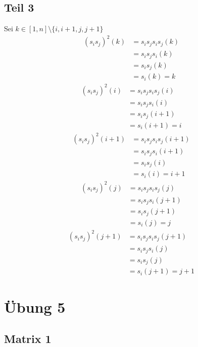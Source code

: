 \documentclass[10pt,a4paper]{article}
\begin{document}
\subsection*{Teil 3}

Sei $k \in [1, n] \setminus \{i, i + 1, j, j + 1\}$
\begin{align*}
(s_{i}s_{j})^{2}(k) & = s_{i}s_{j}s_{i}s_{j}(k)\\
& = s_{i}s_{j}s_{i}(k)\\
& = s_{i}s_{j}(k)\\
& = s_{i}(k) = k
\end{align*}
\begin{align*}
(s_{i}s_{j})^{2}(i) & = s_{i}s_{j}s_{i}s_{j}(i)\\
& = s_{i}s_{j}s_{i}(i)\\
& = s_{i}s_{j}(i + 1)\\
& = s_{i}(i + 1) = i
\end{align*}
\begin{align*}
(s_{i}s_{j})^{2}(i + 1) & = s_{i}s_{j}s_{i}s_{j}(i + 1)\\
& = s_{i}s_{j}s_{i}(i + 1)\\
& = s_{i}s_{j}(i)\\
& = s_{i}(i) = i + 1
\end{align*}
\begin{align*}
(s_{i}s_{j})^{2}(j) & = s_{i}s_{j}s_{i}s_{j}(j)\\
& = s_{i}s_{j}s_{i}(j + 1)\\
& = s_{i}s_{j}(j + 1)\\
& = s_{i}(j) = j
\end{align*}
\begin{align*}
(s_{i}s_{j})^{2}(j + 1) & = s_{i}s_{j}s_{i}s_{j}(j + 1)\\
& = s_{i}s_{j}s_{i}(j)\\
& = s_{i}s_{j}(j)\\
& = s_{i}(j + 1) = j + 1
\end{align*}

\section*{Übung 5}

\subsection*{Matrix 1}
\end{document}
